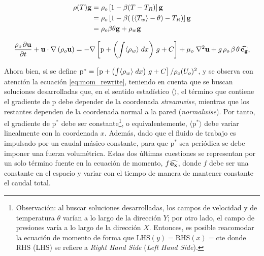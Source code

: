 \begin{equation}
\begin{aligned}
\rho(T) \mathbf{g} &= \rho_o \left[ 1 - \beta (T - T_R) \right] \mathbf{g} \\
				   &= \rho_o \left[ 1 - \beta ( \hspace{0.5mm} (\langle T_w \rangle - \theta) - T_R) \right] \mathbf{g} \\
 		           &= \rho_o \beta \theta \mathbf{g} + \rho_w \mathbf{g}
\end{aligned}
\label{eq:bussinesq}
\end{equation}

\begin{equation}
\frac{ \rho_o \hspace{0.5mm} \partial \mathbf{u}}{\partial t} + \mathbf{u} \cdot \nabla  \left( \rho_o \mathbf{u} \right) = -\nabla \left[ \text{p} + \left( \int \langle \rho_{w} \rangle \hspace{1mm} dx \right) \hspace{0.5mm} g + C \right] + \mu_o \hspace{1mm} {\nabla}^2 \mathbf{u}  + g \hspace{0.5mm} \rho_o \hspace{0.5mm} \beta \hspace{0.5mm} \theta \hspace{0.5mm} \mathbf{\widehat{e_g}},
\label{eq:mom_rewrite}  
\end{equation}

Ahora bien, si se define $\text{p}^* = \left[ \text{p} + \left( \int \langle \rho_{w} \rangle \hspace{1mm} dx \right) \hspace{0.5mm} g + C \right] / \rho_o (U_o)^2 $, y se observa con atención la ecuación \ref{eq:mom_rewrite}, teniendo en cuenta que se buscan soluciones desarrolladas que, en el sentido estadístico $\langle \rangle$, el término que contiene el gradiente de p debe depender de la coordenada \textit{streamwise}, mientras que los restantes dependen de la coordenada normal a la pared (\textit{normalwise}). Por tanto, el gradiente de $\text{p}^*$ debe ser constante\footnote{Observación: al buscar soluciones desarrolladas, los campos de velocidad y de temperatura $\theta$ varían a lo largo de la dirección $Y$; por otro lado, el campo de presiones varía a lo largo de la dirección $X$. Entonces, es posible reacomodar la ecuación de momento de forma que $\text{LHS}(y)=\text{RHS}(x)=\text{cte}$ donde RHS (LHS) se refiere a \textit{Right Hand Side} (\textit{Left Hand Side}).}, o equivalentemente, $\langle \text{p}^* \rangle$ debe variar linealmente con la coordenada $x$. Además, dado que el fluido de trabajo es impulsado por un caudal másico constante, para que $\text{p}^*$ sea periódica se debe imponer una fuerza volumétrica. Estas dos últimas cuestiones se representan por un solo término fuente en la ecuación de momento, $f \hspace{0.3mm} \mathbf{\widehat{e_x}}$, donde $f$ debe ser una constante en el espacio y variar con el tiempo de manera de mantener constante el caudal total.

